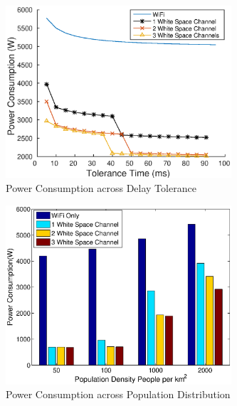 







\begin{figure}
\vspace{-0.0in}
\centering
\includegraphics[width=84mm]{figures/delay_vary}
\vspace{-0.1in}
\caption{Power Consumption across Delay Tolerance}
\label{fig:delayvary}
\vspace{-0.1in}
\end{figure}





\begin{figure}
\vspace{-0.0in}
\centering
\includegraphics[width=84mm]{figures/populationvary}
\vspace{-0.1in}
\caption{Power Consumption across Population Distribution}
\label{fig:delayvary}
\vspace{-0.1in}
\end{figure}



